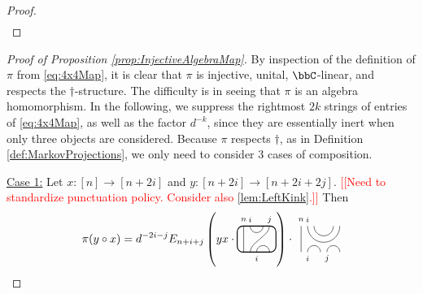 \documentclass[11pt]{article}
\theoremstyle{plain}
\theoremstyle{definition}
\newcommand{\nn}[1]{\textcolor{red}{[[#1]]}}
\newcommand{\TLPlusPIso}[3]{
 \TLTStart
 \TLTThrough{#1}
 \TLTSnakeR{#2}{#3}
 \TLTEnd
}
\newcommand{\TLCapJoin}[5]{
 \TLTStart
 \TLTThrough{#1}
 \TLTCapJoin{#2}{#3}{#4}{#5}
 \TLTEnd
}
\newcommand{\TLTCalcLabelOffset}[3][0cm]{
 \settowidth{#2}{\scriptsize{$#3$}}
 \setlength{#2}{.5#2}
 \setlength{#2}{\maxof{#2}{#1}}
}
\newcommand{\TLTEnd}{
 \draw[thick, rounded corners = 5pt] (0,0) rectangle ($ (TLTlead) + (0,.8) $);
 \end{tikzpicture}
}
\newcommand{\TLTStart}{
 \begin{tikzpicture}[baseline=.3cm]
 \coordinate (TLTlead) at (.2,0); %
 \let\TLTlabelwidth\relax
 \newlength{\TLTlabelwidth}
}
\newcommand{\TLTThrough}[1]{
 \TLTCalcLabelOffset[.2cm]{\TLTlabelwidth}{#1}
 \coordinate (TLTlead) at ($ (TLTlead) + ({\TLTlabelwidth},0) $);
 \begin{scope}[shift=(TLTlead)]
  \draw (0,0) -- (0,.8);
  \node at (0,1) {\scriptsize{$#1$}};
 \end{scope}
  \coordinate (TLTlead) at ($ (TLTlead) + ({\TLTlabelwidth},0) $);
}
\newcommand{\TLTSnakeR}[2]{
 \let\TLTscwidth\relax
 \newlength{\TLTscwidth}
 \let\TLTsswidth\relax
 \newlength{\TLTsswidth}
 \TLTCalcLabelOffset[.2cm]{\TLTscwidth}{#1}
 \TLTCalcLabelOffset[.5cm]{\TLTsswidth}{#2}
 \setlength{\TLTlabelwidth}{\TLTscwidth+\TLTsswidth}
 \setlength{\TLTlabelwidth}{\maxof{\TLTlabelwidth}{.7cm}} %
 \coordinate (TLTlead) at ($ (TLTlead) + ({\TLTscwidth},0) $);
 \begin{scope}[shift=(TLTlead)]
  \draw (.1,.8) arc (-180:0:.2cm);
  \draw (.1,0) .. controls ++(90:.3cm) and ++(270:.3cm) .. ($ (.1,.8) + ({\TLTlabelwidth},0) $);
  \draw ($ (.1,0) + ({\TLTsswidth},0) $) arc (180:0:.2cm);
  \node at (.1,1) {\scriptsize{$#1$}};
  \node at ($ (.1,1) + ({\TLTlabelwidth},0) $) {\scriptsize{$#2$}};
  \node at ($ (.1,-.2) + ({\TLTsswidth},0) $) {\scriptsize{$#1$}};
 \end{scope}
 \coordinate (TLTlead) at ($ (TLTlead) + ({\TLTlabelwidth+\TLTsswidth},0) $);
}
\newcommand{\TLTCapJoin}[4]{
 \let\TLTjoinlwidth\relax
 \newlength{\TLTjoinlwidth}
 \let\TLTjoinrwidth\relax
 \newlength{\TLTjoinrwidth}
 \let\TLTsplitlwidth\relax
 \newlength{\TLTsplitlwidth}
 \let\TLTsplitrwidth\relax
 \newlength{\TLTsplitrwidth}
 \TLTCalcLabelOffset[.8cm]{\TLTjoinrwidth}{#4} %
 \TLTCalcLabelOffset[.15cm]{\TLTjoinlwidth}{#3} %
 \TLTCalcLabelOffset[.6cm]{\TLTsplitlwidth}{#1}
 \TLTCalcLabelOffset[.6cm]{\TLTsplitrwidth}{#2}
 \setlength{\TLTlabelwidth}{\maxof{\TLTjoinlwidth}{\TLTsplitlwidth}}
 \coordinate (TLTlead) at ($ (TLTlead) + ({\TLTlabelwidth},0) $);
 \setlength{\TLTlabelwidth}{\maxof{\TLTjoinrwidth}{\TLTsplitrwidth}} %
 \begin{scope}[shift=(TLTlead)]
  \draw (0,.8) arc (-180:0:.5);
  \draw (0.2,.8) arc (-180:0:.3);
  \draw (0,0) arc (180:0:.2);
  \draw ({\TLTsplitlwidth},0) arc (180:0:.2);
  \node at (0,1) {\scriptsize{$#4$}};
  \node at ({\TLTjoinlwidth},1) {\scriptsize{$#3$}};
  \node at (0,-.2) {\scriptsize{$#1$}};
  \node at ({\TLTsplitlwidth},-.2) {\scriptsize{$#2$}};
 \end{scope}
 \coordinate (TLTlead) at ($ (TLTlead) + ({\TLTlabelwidth},0) $);
}
\begin{document}
\begin{proof}
\begin{align*}
\end{align*}
\end{proof}

\begin{proof}[Proof of Proposition \ref{prop:InjectiveAlgebraMap}]
By inspection of the definition of $\pi$ from \eqref{eq:4x4Map}, it is clear that $\pi$ is injective, unital, $\bbC$-linear, and respects the $\dag$-structure. 
The difficulty is in seeing that $\pi$ is an algebra homomorphism. 
In the following, we suppress the rightmost $2k$ strings of entries of \eqref{eq:4x4Map}, as well as the factor $d^{-k}$, since they are essentially inert when only three objects are considered. 
Because $\pi$ respects $\dag$, as in Definition \ref{def:MarkovProjections}, we only need to consider 3 cases of composition.
\item[\underline{Case 1:}]
Let $x:[n]\rightarrow [n+2i]$ and $y:[n+2i]\rightarrow [n+2i+2j]$. 
 \nn{Need to standardize punctuation policy. Consider also \ref{lem:LeftKink}.}
Then 
$$
\pi(y\circ x)
=
d^{-2i-j}E_{n+i+j}
\left(yx \cdot 
 \begin{tikzpicture}[baseline=.3cm]
  \draw (.2,0) -- (.2,.8);
  \node at (.2,1) {\scriptsize{$n$}};
  \draw (.4,.8) arc (-180:0:.2cm);
  \node at (.4,1) {\scriptsize{$i$}};
  \draw (.4,0) .. controls ++(90:.3cm) and ++(270:.3cm) .. (1,.8);
  \node at (1,1) {\scriptsize{$j$}};
  \draw (.6,0) arc (180:0:.2cm);
  \node at (.6,-.2) {\scriptsize{$i$}};
  \draw[thick, rounded corners = 5pt] (0,0) rectangle (1.2,.8);
 \end{tikzpicture}
 \right) 
\cdot 
 \begin{tikzpicture}[baseline=.3cm]
  \draw (.2,0) -- (.2,.8);
  \node at (.2,1) {\scriptsize{$n$}};
  \draw (.4,0) arc (180:0:.2cm);
  \node at (.4,-.2) {\scriptsize{$i$}};
  \draw (1,0) arc (180:0:.2cm);
  \node at (1,-.2) {\scriptsize{$j$}};
  \draw (.4,.8) arc (-180:0:.5cm);
  \node at (.4,1) {\scriptsize{$i$}};
  \draw (.6,.8) arc (-180:0:.3cm);

\end{tikzpicture}$$
\end{proof}
\end{document}
